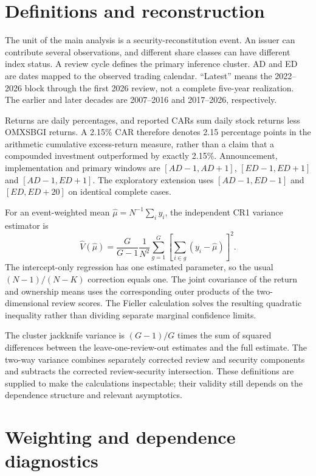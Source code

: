 \section{Definitions and reconstruction}
\label{app:definitions}

The unit of the main analysis is a security-reconstitution event. An issuer can contribute several observations, and different share classes can have different index status. A review cycle defines the primary inference cluster. AD and ED are dates mapped to the observed trading calendar. ``Latest'' means the 2022--2026 block through the first 2026 review, not a complete five-year realization. The earlier and later decades are 2007--2016 and 2017--2026, respectively.

Returns are daily percentages, and reported CARs sum daily stock returns less OMXSBGI returns. A 2.15\% CAR therefore denotes 2.15 percentage points in the arithmetic cumulative excess-return measure, rather than a claim that a compounded investment outperformed by exactly 2.15\%. Announcement, implementation and primary windows are $[AD-1,AD+1]$, $[ED-1,ED+1]$ and $[AD-1,ED+1]$. The exploratory extension uses $[AD-1,ED-1]$ and $[ED,ED+20]$ on identical complete cases.

For an event-weighted mean $\widehat\mu=N^{-1}\sum_i y_i$, the independent CR1 variance estimator is
\begin{equation}
 \widehat V(\widehat\mu)=\frac{G}{G-1}\frac{1}{N^2}
 \sum_{g=1}^G\left[\sum_{i\in g}(y_i-\widehat\mu)\right]^2.
\end{equation}
The intercept-only regression has one estimated parameter, so the usual $(N-1)/(N-K)$ correction equals one. The joint covariance of the return and ownership means uses the corresponding outer products of the two-dimensional review scores. The Fieller calculation solves the resulting quadratic inequality rather than dividing separate marginal confidence limits.

The cluster jackknife variance is $(G-1)/G$ times the sum of squared differences between the leave-one-review-out estimates and the full estimate. The two-way variance combines separately corrected review and security components and subtracts the corrected review-security intersection. These definitions are supplied to make the calculations inspectable; their validity still depends on the dependence structure and relevant asymptotics.

\section{Weighting and dependence diagnostics}
\label{app:dependence}


